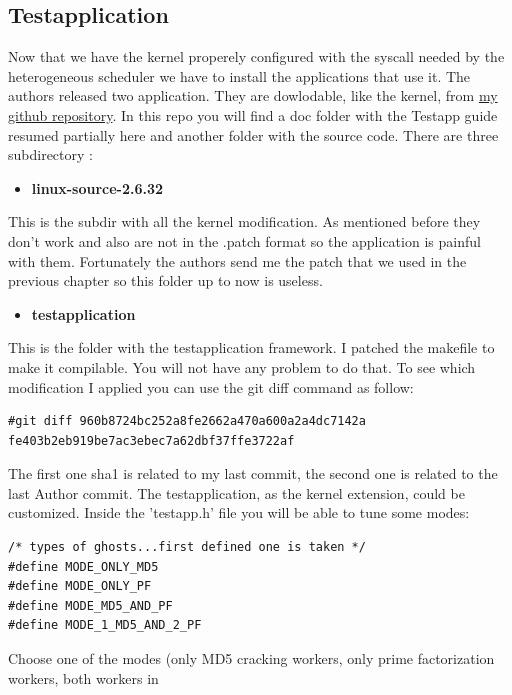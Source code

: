 \documentclass[a4paper,13pt]{article}
\begin{document}
\begin{multicols}{2}
\subsection{Testapplication}
    Now that we have the kernel properely configured with the syscall needed by the heterogeneous
    scheduler we have to install the applications that use it. The authors released two application.
    They are dowlodable, like the kernel, from \href{https://github.com/m4mbr3/RTOS_application.git}{my github repository}.
    In this repo you will find a doc folder with the Testapp guide \cite{doc_testapp} resumed partially here and 
    another folder with the source code. There are three subdirectory :
    \begin{itemize}
        \item{{\bf linux-source-2.6.32}}\\
    \end{itemize}
        This is the subdir with all the kernel modification. As mentioned before they don't work and also
        are not in the .patch format so the application is painful with them. Fortunately the authors
        send me the patch that we used in the previous chapter so this folder up to now is useless.
    \begin{itemize}
        \item{{\bf testapplication}}\\
    \end{itemize}
        This is the folder with the testapplication framework. I patched the makefile to make it compilable.
        You will not have any problem to do that. To see which  modification I applied you can use the git diff
        command as follow:
        \begin{lstlisting}
#git diff 960b8724bc252a8fe2662a470a600a2a4dc7142a fe403b2eb919be7ac3ebec7a62dbf37ffe3722af
        \end{lstlisting}
        The first one sha1 is related to my last commit, the second one is related to the last Author commit.
               The testapplication, as the kernel extension, could be customized. Inside the 'testapp.h' file you
        will be able to tune some modes:
        \begin{lstlisting}
/* types of ghosts...first defined one is taken */
#define MODE_ONLY_MD5
#define MODE_ONLY_PF
#define MODE_MD5_AND_PF
#define MODE_1_MD5_AND_2_PF
        \end{lstlisting}
        Choose one of the modes (only MD5 cracking workers, only prime factorization workers, both workers in 

\end{multicols}
\end{document}

